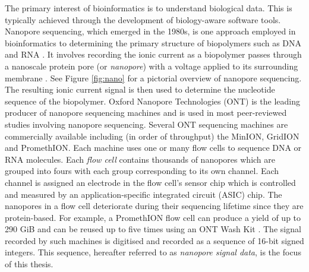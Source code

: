 The primary interest of bioinformatics is to understand biological data. This is typically achieved through the development of biology-aware software tools. Nanopore sequencing, which emerged in the 1980s, is one approach employed in bioinformatics to determining the primary structure of biopolymers such as DNA and RNA \cite{three-decades-nano}. It involves recording the ionic current as a biopolymer passes through a nanoscale protein pore (or \textit{nanopore}) with a voltage applied to its surrounding membrane \cite{Wang2021}. See Figure \ref{fig:nano} for a pictorial overview of nanopore sequencing. The resulting ionic current signal is then used to determine the nucleotide sequence of the biopolymer. Oxford Nanopore Technologies (ONT) is the leading producer of nanopore sequencing machines and is used in most peer-reviewed studies involving nanopore sequencing. Several ONT sequencing machines are commercially available including (in order of throughput) the MinION, GridION and PromethION.
Each machine uses one or many flow cells to sequence DNA or RNA molecules. Each \textit{flow cell} contains thousands of nanopores which are grouped into fours with each group corresponding to its own channel. Each channel is assigned an electrode in the flow cell's sensor chip which is controlled and measured by an application-specific integrated circuit (ASIC) chip. The nanopores in a flow cell deteriorate during their sequencing lifetime since they are protein-based. For example, a PromethION flow cell can produce a yield of up to 290 GiB and can be reused up to five times using an ONT Wash Kit \cite{nano-web}.
The signal recorded by such machines is digitised and recorded as a sequence of 16-bit signed integers. This sequence, hereafter referred to as \textit{nanopore signal data}, is the focus of this thesis.


